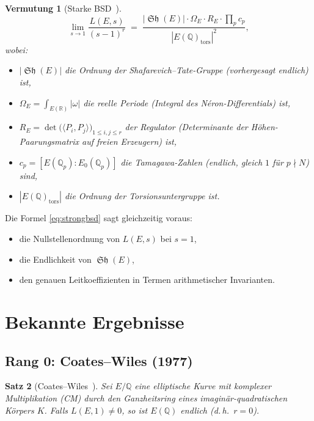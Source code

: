 \documentclass[12pt,a4paper]{article}
\newtheorem{theorem}{Satz}[section]
\newtheorem{conjecture}[theorem]{Vermutung}
\theoremstyle{remark}
\DeclareMathOperator{\Sha}{\mathfrak{Sh}}
\begin{document}
\begin{conjecture}[Starke BSD~\cite{BSD1965,Tate1966}]
  \begin{equation}\label{eq:strongbsd}
    \lim_{s\to 1} \frac{L(E,s)}{(s-1)^r}
    \;=\;
    \frac{|\Sha(E)| \cdot \Omega_E \cdot R_E \cdot \prod_p c_p}
         {|E(\mathbb{Q})_{\mathrm{tors}}|^2},
  \end{equation}
  wobei:
  \begin{itemize}[nosep]
    \item $|\Sha(E)|$ die Ordnung der Shafarevich--Tate-Gruppe (vorhergesagt endlich) ist,
    \item $\Omega_E = \int_{E(\mathbb{R})} |\omega|$ die reelle Periode
          (Integral des Néron-Differentials) ist,
    \item $R_E = \det\bigl(\langle P_i, P_j \rangle\bigr)_{1\leq i,j\leq r}$ der
          Regulator (Determinante der Höhen-Paarungsmatrix auf freien Erzeugern) ist,
    \item $c_p = [E(\mathbb{Q}_p) : E_0(\mathbb{Q}_p)]$ die Tamagawa-Zahlen
          (endlich, gleich $1$ für $p \nmid N$) sind,
    \item $|E(\mathbb{Q})_{\mathrm{tors}}|$ die Ordnung der Torsionsuntergruppe ist.
  \end{itemize}
\end{conjecture}

Die Formel \eqref{eq:strongbsd} sagt gleichzeitig voraus:
\begin{itemize}[nosep]
  \item die Nullstellenordnung von $L(E,s)$ bei $s=1$,
  \item die Endlichkeit von $\Sha(E)$,
  \item den genauen Leitkoeffizienten in Termen arithmetischer Invarianten.
\end{itemize}

\section{Bekannte Ergebnisse}

\subsection{Rang 0: Coates--Wiles (1977)}

\begin{theorem}[Coates--Wiles~\cite{CoatesWiles1977}]
  Sei $E/\mathbb{Q}$ eine elliptische Kurve mit komplexer Multiplikation (CM) durch den
  Ganzheitsring eines imaginär-quadratischen Körpers $K$. Falls $L(E,1) \neq 0$, so ist
  $E(\mathbb{Q})$ endlich (d.\,h.\ $r = 0$).
\end{theorem}
\end{document}

